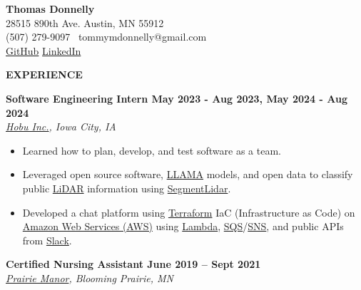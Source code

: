 \textbf{Thomas Donnelly}\\
28515 890th Ave. \textbar{} Austin, MN 55912\\
(507) 279-9097 \textbar~tommymdonnelly@gmail.com\\
\href{https://github.com/TomTheTonk}{GitHub}
\href{http://linkedin.com/in/thomas-donnelly-429405320}{LinkedIn}

\textbf{EXPERIENCE}

\textbf{Software Engineering Intern May 2023 - Aug 2023, May 2024 - Aug
2024}\\
\emph{\href{https://www.linkedin.com/company/hobu-inc}{Hobu Inc.}, Iowa
City, IA}

\begin{itemize}
\item
  Learned how to plan, develop, and test software as a team.
\item
  Leveraged open source software, \href{https://www.llama.com/}{LLAMA}
  models, and open data to classify public
  \href{https://www.neonscience.org/resources/learning-hub/tutorials/lidar-basics}{LiDAR}
  information using
  \href{https://github.com/Yarroudh/segment-lidar}{SegmentLidar}.
\item
  Developed a chat platform using
  \href{https://developer.hashicorp.com/terraform/language}{Terraform}
  IaC (Infrastructure as Code) on
  \href{https://aws.amazon.com/free/?gclid=CjwKCAiAiOa9BhBqEiwABCdG8xJm7dpo0Ifa4i8UYcSexU289wg1I5QgB0YQaTpD3Cc5l3oCR2H94hoCvTYQAvD_BwE\&trk=6a4c3e9d-cdc9-4e25-8dd9-2bd8d15afbca\&sc_channel=ps\&ef_id=CjwKCAiAiOa9BhBqEiwABCdG8xJm7dpo0Ifa4i8UYcSexU289wg1I5QgB0YQaTpD3Cc5l3oCR2H94hoCvTYQAvD_BwE:G:s\&s_kwcid=AL!4422!3!651751059777!e!!g!!amazon\%20web\%20services!19852662197!145019195737\&all-free-tier.sort-by=item.additionalFields.SortRank\&all-free-tier.sort-order=asc\&awsf.Free\%20Tier\%20Types=*all\&awsf.Free\%20Tier\%20Categories=*all}{Amazon
  Web Services (AWS)} using
  \href{https://aws.amazon.com/pm/lambda/?gclid=CjwKCAiAiOa9BhBqEiwABCdG8_-jcsK9i3KVP2t5NgupDXinpyF36M-7OgfzGPhJI0F8zaahD0sMmBoC8NIQAvD_BwE\&trk=e0e0d4be-47fe-4336-ab69-7eece7f3d36e\&sc_channel=ps\&ef_id=CjwKCAiAiOa9BhBqEiwABCdG8_-jcsK9i3KVP2t5NgupDXinpyF36M-7OgfzGPhJI0F8zaahD0sMmBoC8NIQAvD_BwE:G:s\&s_kwcid=AL!4422!3!652240143523!e!!g!!amazon\%20lambda!19878797032!147151597893}{Lambda},
  \href{https://aws.amazon.com/sqs/}{SQS}/\href{https://aws.amazon.com/sns/}{SNS},
  and public APIs from \href{https://api.slack.com/}{Slack}.
\end{itemize}

\textbf{Certified Nursing Assistant June 2019 -- Sept 2021}\\
\emph{\href{https://prairiemanorcare.com/}{Prairie Manor}, Blooming
Prairie, MN}

